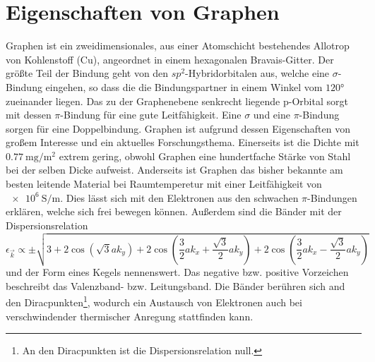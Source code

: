 \section{Eigenschaften von Graphen}
Graphen ist ein zweidimensionales, aus einer Atomschicht bestehendes Allotrop von Kohlenstoff (Cu), angeordnet in einem hexagonalen
Bravais-Gitter. 
Der größte Teil der Bindung geht von den $sp^2$-Hybridorbitalen aus, welche eine $\sigma$-Bindung eingehen, so dass 
die die Bindungspartner in einem Winkel vom $\ang{120;;}$ zueinander liegen. 
Das zu der Graphenebene senkrecht liegende p-Orbital sorgt mit dessen $\pi$-Bindung für eine gute Leitfähigkeit.\cite{graphene_properties}
Eine $\sigma$ und eine $\pi$-Bindung sorgen für eine Doppelbindung.
Graphen ist aufgrund dessen Eigenschaften von großem Interesse und ein aktuelles Forschungsthema.
Einerseits ist die  Dichte mit $\qty{0.77}{\milli\gram\per\metre\squared}$ extrem gering, obwohl 
Graphen eine hundertfache Stärke von Stahl bei der selben Dicke aufweist.\cite{graphene_properties} 
Anderseits ist Graphen das bisher bekannte am besten leitende Material bei Raumtemperetur mit einer Leitfähigkeit von 
$\qty{e6}{\siemens\per\metre}$\cite{graphene_properties}. 
Dies lässt sich mit den Elektronen aus den schwachen $\pi$-Bindungen erklären, welche sich frei bewegen können.
Außerdem sind die Bänder mit der Dispersionsrelation
\begin{equation*}
    \epsilon_{\vec{k}} \propto \pm \sqrt{3+2\cos(\sqrt{3}ak_y)+2\cos(\frac{3}{2}ak_x+\frac{\sqrt{3}}{2}ak_y) + 2\cos(\frac{3}{2}ak_x-\frac{\sqrt{3}}{2}ak_y) }
\end{equation*}
und der Form eines Kegels nennenswert.
Das negative bzw. positive Vorzeichen beschreibt das Valenzband- bzw. Leitungsband. 
Die Bänder berühren sich and den Diracpunkten\footnote{An den Diracpunkten ist die Dispersionsrelation null.}, wodurch ein Austausch von Elektronen auch bei verschwindender thermischer Anregung 
stattfinden kann.\cite{graphene_properties}
